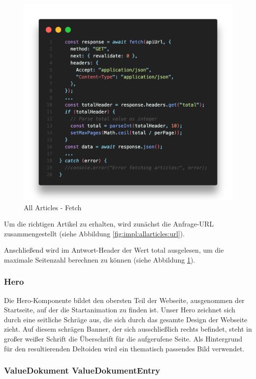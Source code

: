 \begin{figure}[H]
    \centering
    \includegraphics[width=\linewidth]{pics/allArticlesFetch.png}
    \caption{All Articles - Fetch}
    \label{fig:impl:allarticles:fetch}
\end{figure}

Um die richtigen Artikel zu erhalten, wird zunächst die Anfrage-URL zusammengestellt (siehe Abbildung \ref{fig:impl:allarticles:url}).

Anschließend wird im Antwort-Header der Wert total ausgelesen, um die maximale Seitenzahl berechnen zu können (siehe Abbildung \ref{fig:impl:allarticles:fetch}).

\subsubsection*{Hero}

Die Hero-Komponente bildet den obersten Teil der Webseite, ausgenommen der Startseite, auf der die Startanimation zu finden ist. Unser Hero zeichnet sich durch eine seitliche Schräge aus, die sich durch das gesamte Design der Webseite zieht. Auf diesem schrägen Banner, der sich ausschließlich rechts befindet, steht in großer weißer Schrift die Überschrift für die aufgerufene Seite. Als Hintergrund für den resultierenden Deltoiden wird ein thematisch passendes Bild verwendet.

\subsubsection*{ValueDokument ValueDokumentEntry}

